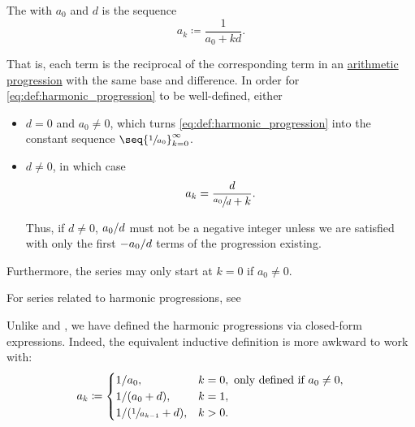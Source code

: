 \begin{definition}\label{def:harmonic_progression}
  The  with  \( a_0 \) and  \( d \) is the sequence
  \begin{equation}\label{eq:def:harmonic_progression}
    a_k \coloneqq \frac 1 {a_0 + kd}.
  \end{equation}

  That is, each term is the reciprocal of the corresponding term in an \hyperref[def:arithmetic_progression]{arithmetic progression} with the same base and difference. In order for \eqref{eq:def:harmonic_progression} to be well-defined, either
  \begin{itemize}
    \item \( d = 0 \) and \( a_0 \neq 0 \), which turns \eqref{eq:def:harmonic_progression} into the constant sequence \( \seq{ \sfrac 1 {a_0} }_{k=0}^\infty \).
    \item \( d \neq 0 \), in which case
    \begin{equation*}
      a_k = \frac d {\sfrac {a_0} d + k}.
    \end{equation*}

    Thus, if \( d \neq 0 \), \( a_0 / d \) must not be a negative integer unless we are satisfied with only the first \( -a_0 / d \) terms of the progression existing.
  \end{itemize}

  Furthermore, the series may only start at \( k = 0 \) if \( a_0 \neq 0 \).

  For series related to harmonic progressions, see 
\end{definition}

\begin{remark}\label{rem:harmonic_progression_recursive_form}
  Unlike  and , we have defined the harmonic progressions via closed-form expressions. Indeed, the equivalent inductive definition is more awkward to work with:
  \begin{equation*}
    a_k \coloneqq \begin{cases}
      1 / a_0,                    & k = 0, \text{ only defined if } a_0 \neq 0, \\
      1 / (a_0 + d),                & k = 1,                                      \\
      1 / (\sfrac 1 {a_{k-1}} + d), & k > 0.
    \end{cases}
  \end{equation*}
\end{remark}

